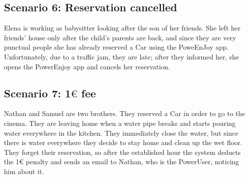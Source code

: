 \subsection{Scenario 6: Reservation cancelled}
Elena is working as babysitter looking after the son of her friends. She left her friends' house only after the child's parents are back, and since they are very punctual people she has already reserved a Car using the PoweEnJoy app. Unfortunately, due to a traffic jam, they are late; after they informed her, she opens the PowerEnjoy app and cancels her reservation.

\subsection{Scenario 7: 1$\euro$ fee}
Nathan and Samuel are two brothers. They reserved a Car in order to go to the cinema. They are leaving home when a water pipe breaks and starts pouring water everywhere in the kitchen. They immediately close the water, but since there is water everywhere they decide to stay home and clean up the wet floor. They forget their reservation, so after the established hour the system deducts the 1$\euro$ penalty and sends an email to Nathan, who is the PowerUser, noticing him about it.